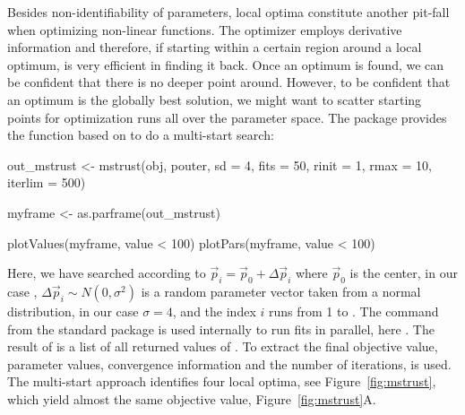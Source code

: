 \documentclass[article]{jss}
\begin{document}
Besides non-identifiability of parameters, local optima constitute another pit-fall when optimizing non-linear functions. The  optimizer employs derivative information and therefore, if starting within a certain region around a local optimum, is very efficient in finding it back. Once an optimum is found, we can be confident that there is no deeper point around. However, to be confident that an optimum is the globally best solution, we might want to scatter starting points for optimization runs all over the parameter space. The  package provides the  function based on  to do a multi-start search:
\begin{CodeChunk}
\begin{CodeInput}
  out_mstrust <- mstrust(obj, pouter, sd = 4, fits = 50,
                         rinit = 1, rmax = 10, iterlim = 500)
  
  myframe <- as.parframe(out_mstrust)
  
  plotValues(myframe, value < 100)
  plotPars(myframe, value < 100)
\end{CodeInput}
\end{CodeChunk}
Here, we have searched according to $\vec p_i = \vec p_0 + \Delta\vec p_i$ where $\vec p_0$ is the center, in our case , $\Delta\vec p_i\sim N(0, \sigma^2)$ is a random parameter vector taken from a normal distribution, in our case $\sigma = 4$, and the index $i$ runs from 1 to . The  command from the standard  package \citep{parallel} is used internally to run fits in parallel, here . The result of  is a list of all returned values of . To extract the final objective value, parameter values, convergence information and the number of iterations,  is used. The multi-start approach identifies four local optima, see Figure~\ref{fig:mstrust}, which yield almost the same objective value, Figure~\ref{fig:mstrust}A.
\end{document}
